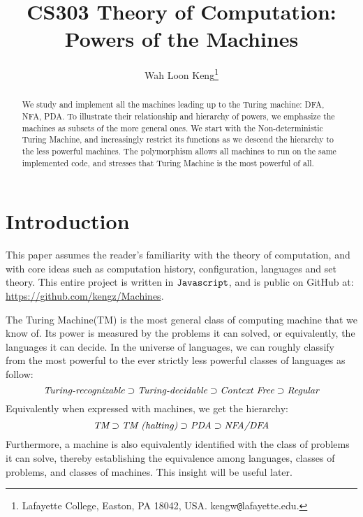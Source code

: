 \documentclass[12pt]{article}  %
\begin{document}
\title{CS303 Theory of Computation:\\ Powers of the Machines}

\author{
{Wah Loon Keng}\thanks{
Lafayette College,
Easton, PA 18042, USA.
kengw{\tt @}lafayette.edu.}
}
\maketitle

\begin{abstract}
We study and implement all the machines leading up to the Turing machine: DFA, NFA, PDA. To illustrate their relationship and hierarchy of powers, we emphasize the machines as subsets of the more general ones. We start with the Non-deterministic Turing Machine, and increasingly restrict its functions as we descend the hierarchy to the less powerful machines. The polymorphism allows all machines to run on the same implemented code, and stresses that Turing Machine is the most powerful of all.
\end{abstract}







\section{Introduction} \label{intro}


This paper assumes the reader's familiarity with the theory of computation, and with core ideas such as computation history, configuration, languages and set theory. This entire project is written in ${\tt Javascript}$, and is public on GitHub at: \url{https://github.com/kengz/Machines}.

The Turing Machine(TM) is the most general class of computing machine that we know of. Its power is measured by the problems it can solved, or equivalently, the languages it can decide. In the universe of languages, we can roughly classify from the most powerful to the ever strictly less powerful classes of languages as follow:
$$\emph{Turing-recognizable} \supset \emph{Turing-decidable} \supset \emph{Context Free} \supset \emph{Regular}$$
Equivalently when expressed with machines, we get the hierarchy:
$$\emph{TM} \supset \emph{TM (halting)} \supset \emph{PDA} \supset \emph{NFA/DFA}$$
Furthermore, a machine is also equivalently identified with the class of problems it can solve, thereby establishing the equivalence among languages, classes of problems, and classes of machines. This insight will be useful later.
\end{document}
